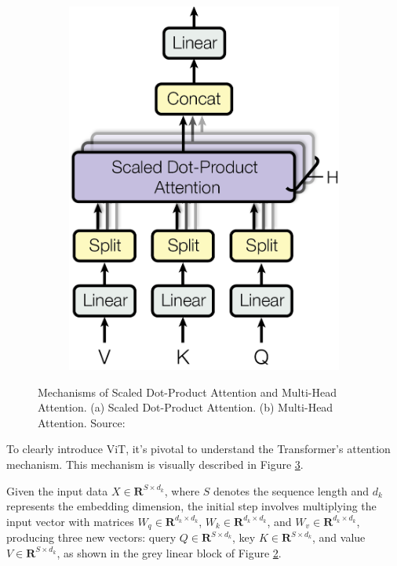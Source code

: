 \begin{figure}
\begin{subfigure}[b]{0.2\textwidth}
        \caption{}
        \label{fig:dotproductattention}
    \end{subfigure}
    \hfill
    \begin{subfigure}[b]{0.3\textwidth}
        \centering
        \includegraphics[width=\textwidth]{assets/charts_rw/Transformer_MultiHeadAttention.png}
        \caption{}
        \label{fig:multiheadattention}
    \end{subfigure}
    \caption{Mechanisms of Scaled Dot-Product Attention and Multi-Head Attention. (a) Scaled Dot-Product Attention. (b) Multi-Head Attention. Source: \parencite{vaswani2017attention}}
    \label{fig:attentionmechanism}
\end{figure}

To clearly introduce ViT, it's pivotal to understand the Transformer's attention mechanism. This mechanism is visually described in Figure \ref{fig:attentionmechanism}. 

Given the input data $X \in \mathbf{R}^{S \times d_k}$, where $S$ denotes the sequence length and $d_k$ represents the embedding dimension, the initial step involves multiplying the input vector with matrices $W_q \in \mathbf{R}^{d_k \times d_k}$, $W_k \in \mathbf{R}^{d_k \times d_k}$, and $W_v \in \mathbf{R}^{d_k \times d_k}$, producing three new vectors: query $Q \in \mathbf{R}^{S \times d_k}$, key $K \in \mathbf{R}^{S \times d_k}$, and value $V \in \mathbf{R}^{S \times d_k}$, as shown in the grey linear block of Figure \ref{fig:multiheadattention}.

